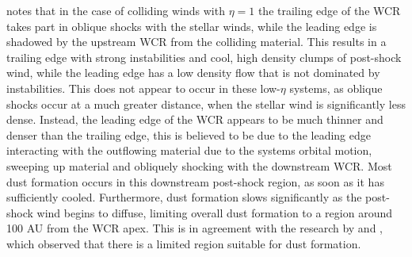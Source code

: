 \documentclass[fleqn,usenatbib]{mnras}
\begin{document}
\cite{pittard_3d_2009} notes that in the case of colliding winds with $\eta = 1$ the trailing edge of the WCR takes part in oblique shocks with the stellar winds, while the leading edge is shadowed by the upstream WCR from the colliding material.
This results in a trailing edge with strong instabilities and cool, high density clumps of post-shock wind, while the leading edge has a low density flow that is not dominated by instabilities.
This does not appear to occur in these low-$\eta$ systems, as oblique shocks occur at a much greater distance, when the stellar wind is significantly less dense.
Instead, the leading edge of the WCR appears to be much thinner and denser than the trailing edge, this is believed to be due to the leading edge interacting with the outflowing material due to the systems orbital motion, sweeping up material and obliquely shocking with the downstream WCR. %
Most dust formation occurs in this downstream post-shock region, as soon as it has sufficiently cooled.
Furthermore, dust formation slows significantly as the post-shock wind begins to diffuse, limiting overall dust formation to a region around 100 AU from the WCR apex. %
This is in agreement with the research by \cite{williams_dust_1990} and \cite{hendrix_pinwheels_2016}, which observed that there is a limited region suitable for dust formation.
\end{document}

